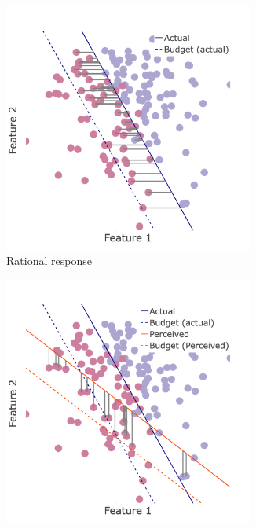 \begin{figure}[ht]
    \centering
    \begin{subfigure}[t]{0.22\textwidth}
        \includegraphics[width=0.9\textwidth]{Figures/lin-NB.png}
            \caption{Rational response}
        \label{fig:NB-arrows-lin-cost}
    \end{subfigure}
    \hspace{0.01in}
    \begin{subfigure}[t]{0.22\textwidth}
        \includegraphics[width=0.9\textwidth]{Figures/lin-B.png}

\end{subfigure}
\end{figure}
